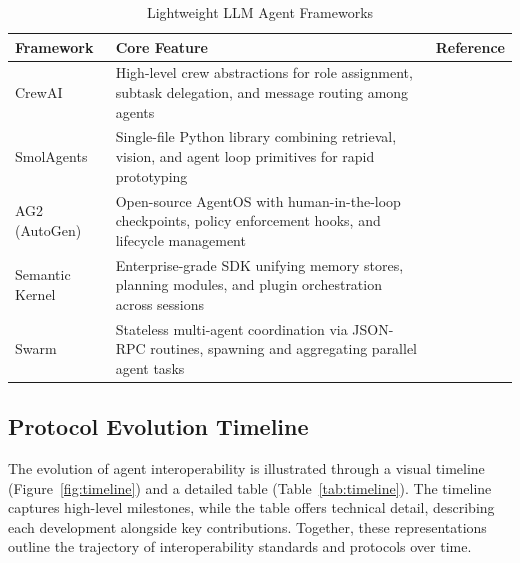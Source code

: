 \documentclass{article}
\begin{document}
\begin{table}[!t]
  \centering
  \renewcommand{\arraystretch}{1.3}
  \captionsetup{justification=centering}
  \caption{Lightweight LLM Agent Frameworks}
  \label{tab:frameworks}
  \begin{tabularx}{\textwidth}{|
    >{\centering\arraybackslash}p{2.5cm}|
    >{\raggedright\arraybackslash}X|
    >{\raggedright\arraybackslash}p{2.5cm}|}
    \hline
    \rowcolor{gray!30}
    \textbf{Framework} & \textbf{Core Feature} & \textbf{Reference} \\
    \hline
    CrewAI            & High-level crew abstractions for role assignment, subtask delegation, and message routing among agents      & \cite{crewai2024}       \\
    SmolAgents        & Single-file Python library combining retrieval, vision, and agent loop primitives for rapid prototyping           & \cite{smolagents2024}   \\
    AG2 (AutoGen)     & Open-source AgentOS with human-in-the-loop checkpoints, policy enforcement hooks, and lifecycle management       & \cite{ag22025}          \\
    Semantic Kernel   & Enterprise-grade SDK unifying memory stores, planning modules, and plugin orchestration across sessions        & \cite{semantickernel2024}\\
    Swarm             & Stateless multi-agent coordination via JSON-RPC routines, spawning and aggregating parallel agent tasks         & \cite{openai2024swarm}  \\
    \bottomrule
  \end{tabularx}
\end{table}







\subsection{Protocol Evolution Timeline}
\label{sec:timeline}

The evolution of agent interoperability is illustrated through a visual timeline (Figure~\ref{fig:timeline}) and a detailed table (Table~\ref{tab:timeline}). The timeline captures high-level milestones, while the table offers technical detail, describing each development alongside key contributions. Together, these representations outline the trajectory of interoperability standards and protocols over time.
\end{document}
